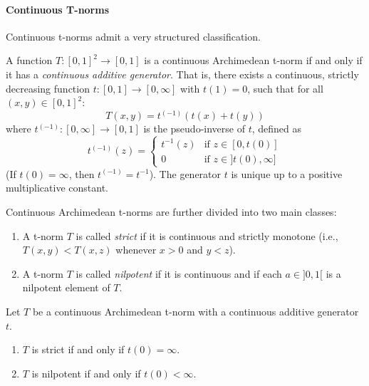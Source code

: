 \paragraph{Continuous T-norms}
Continuous t-norms admit a very structured classification.

\begin{theorem}
  A function $T: [0,1]^2 \to [0,1]$ is a continuous Archimedean t-norm if and only if it has a \emph{continuous additive generator}. That is, there exists a continuous, strictly decreasing function $t: [0,1] \to [0,\infty]$ with $t(1)=0$, such that for all $(x,y) \in [0,1]^2$:
  \[
  T(x,y) = t^{(-1)}(t(x) + t(y))
  \]
  where $t^{(-1)}: [0,\infty] \to [0,1]$ is the pseudo-inverse of $t$, defined as
  \[
  t^{(-1)}(z) =
  \begin{cases}
    t^{-1}(z) & \text{if } z \in [0, t(0)] \\
    0 & \text{if } z \in ]t(0), \infty]
  \end{cases}
  \]
  (If $t(0)=\infty$, then $t^{(-1)} = t^{-1}$). The generator $t$ is unique up to a positive multiplicative constant.
\end{theorem}

Continuous Archimedean t-norms are further divided into two main classes:

\begin{definition}
  \begin{enumerate}
      \item A t-norm $T$ is called \emph{strict} if it is continuous and strictly monotone (i.e., $T(x,y) < T(x,z)$ whenever $x>0$ and $y<z$).
      \item A t-norm $T$ is called \emph{nilpotent} if it is continuous and if each $a \in ]0,1[$ is a nilpotent element of $T$.
  \end{enumerate}
\end{definition}

\begin{corollary}
  Let $T$ be a continuous Archimedean t-norm with a continuous additive generator $t$.
  \begin{enumerate}
      \item $T$ is strict if and only if $t(0) = \infty$.
      \item $T$ is nilpotent if and only if $t(0) < \infty$.
  \end{enumerate}
\end{corollary}

